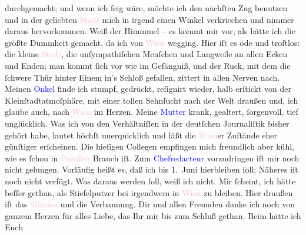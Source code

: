                durchgemacht; und wenn ich feig wäre, möchte ich den nächſten Zug benutzen und in der
               geliebten \textcolor{pink}{Stadt}{} mich in irgend
               einen Winkel verkriechen und nimmer daraus hervorkommen. Weiß der Himmmel – es kommt
               mir vor, als hätte ich die größte Dummheit gemacht, da ich von \textcolor{pink}{Wien}{}\ledrightnote{\textcolor{pink}{Wien}} wegging. Hier iſt es öde und troſtlos: die kleine \textcolor{pink}{Stadt}{}, die unſympathiſchen
               Menſchen und Langweile an allen Ecken und Enden; man kommt ſich vor wie im Gefängniß,
               und der Ruck, mit dem {\pb}die ſchwere Thür hinter Einem
               in’s Schloß gefallen, zittert in allen Nerven nach. Meinen \textcolor{blue}{Onkel}{} finde ich stumpf, gedrückt, reſignirt
               wieder, halb erſtickt von der Kleinſtadtatmoſphäre, mit einer tollen Sehnſucht nach
               der Welt draußen und, ich glaube auch, nach \textcolor{pink}{Wien}{}\ledrightnote{\textcolor{pink}{Wien}}
               im Herzen. Meine \textcolor{blue}{Mutter}{}
               krank, gealtert, ſorgenvoll, tief unglücklich. Was ich von den Verhältniſſen in der
               deutſchen Journaliſtik bisher gehört habe, lautet höchſt unerquicklich und läßt die
                  \textcolor{pink}{Wien}{}\ledrightnote{\textcolor{pink}{Wien}}er Zuſtände eher günſtiger erſcheinen. Die
               hieſigen Collegen empfingen mich freundlich aber kühl, wie es ſchon in \textcolor{pink}{Preußen}{}\ledrightnote{\textcolor{pink}{Preußen}} Brauch iſt. Zum \textcolor{blue}{Chefredacteur}{} vorzudringen iſt mir noch
               nicht gelungen. Vorläufig heißt es, daß ich bis 1. Juni hierbleiben ſoll; Näheres iſt noch nicht verfügt. Was daraus
               werden ſoll, weiß ich nicht. Mir ſcheint, ich hätte beſſer gethan, als {\pb}Stiefelputzer bei irgendwem in \textcolor{pink}{Wien}{}\ledrightnote{\textcolor{pink}{Wien}} zu bleiben. Hier draußen iſt das \textcolor{pink}{Sibirien}{}\ledrightnote{\textcolor{pink}{Sibirien}} und die Verbannung.\pend
           \pstart
           Dir und allen Freunden danke ich noch von ganzem Herzen für alles Liebe, das Ihr  mir bis zum Schluß gethan. Beim \label{K_L02660-2v}\label{K_L02660-2h} hätte ich Euch
